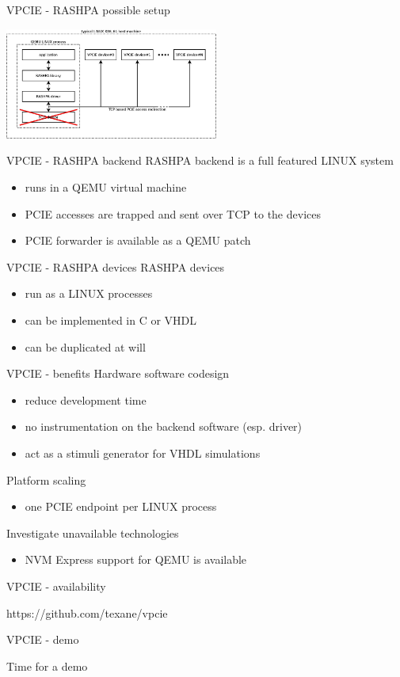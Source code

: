 \documentclass{beamer}
\begin{document}
\begin{frame}{VPCIE - RASHPA possible setup}
  \begin{center}
  \includegraphics[width=70mm]{pic/dv_rashpa/main.jpeg}
  \end{center}
\end{frame}

\begin{frame}{VPCIE - RASHPA backend}
  RASHPA backend is a full featured LINUX system
  \begin{itemize}
  \item runs in a QEMU virtual machine
  \item PCIE accesses are trapped and sent over TCP to the devices
  \item PCIE forwarder is available as a QEMU patch
  \end{itemize}
\end{frame}

\begin{frame}{VPCIE - RASHPA devices}
  RASHPA devices
  \begin{itemize}
  \item run as a LINUX processes
  \item can be implemented in C or VHDL
  \item can be duplicated at will
  \end{itemize}
\end{frame}

\begin{frame}{VPCIE - benefits}
  Hardware software codesign
  \begin{itemize}
  \item reduce development time
  \item no instrumentation on the backend software (esp. driver)
  \item act as a stimuli generator for VHDL simulations
  \end{itemize}

  Platform scaling
  \begin{itemize}
  \item one PCIE endpoint per LINUX process
  \end{itemize}

  Investigate unavailable technologies
  \begin{itemize}
  \item NVM Express support for QEMU is available
  \end{itemize}
\end{frame}

\begin{frame}{VPCIE - availability}
  \begin{center}https://github.com/texane/vpcie\end{center}
\end{frame}

\begin{frame}{VPCIE - demo}
  \begin{center}Time for a demo\end{center}
\end{frame}
\end{document}
